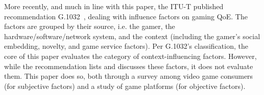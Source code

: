 More recently, and much in line with this paper, the \acrshort{ITU-T}
published recommendation G.1032~\cite{itutg1032}, dealing with
influence factors on gaming \gls{QoE}. The factors are grouped by
their source, i.e. the gamer, the hardware/software/network system,
and the context (including the gamer's social embedding, novelty,
and game service factors). Per G.1032's classification, the core of
this paper evaluates the category of context-influencing factors.
However, while the recommendation lists and discusses these factors,
it does not evaluate them. This paper does so, both through a survey
among video game consumers (for subjective factors) and a study of
game platforms (for objective factors).

